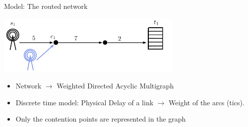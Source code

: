 \documentclass[10 pt]{beamer}
\begin{document}
\begin{frame}{Model: The routed network}
\begin{center}
  \includegraphics [width=9cm]{1routealler} 
\end{center}

\begin{itemize}
\item Network $\rightarrow$ Weighted Directed Acyclic Multigraph
\item  Discrete time model: Physical Delay of a link $\rightarrow$ Weight of the arcs (tics).
\item  Only the contention points are represented in the graph
\end{itemize}

\begin{center}
  \end{center}


 \end{frame}
 
\end{document}
